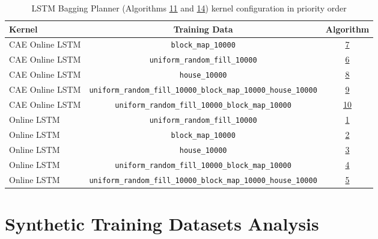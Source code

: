 \begin{table}[h!]
    \centerfloat
    \begin{tabular}{|M{2cm}|c|c|}
         \hline
         \textbf{Kernel} & \textbf{Training Data} & \textbf{Algorithm}\\
         \hline
         \hline
         CAE Online LSTM & \texttt{block\_map\_10000} &  \hyperref[tab: evalalgorithms]{7} \\
         \hline
         CAE Online LSTM & \texttt{uniform\_random\_fill\_10000} &  \hyperref[tab: evalalgorithms]{6} \\
         \hline
         CAE Online LSTM & \texttt{house\_10000} &  \hyperref[tab: evalalgorithms]{8} \\
         \hline
         CAE Online LSTM & \texttt{uniform\_random\_fill\_10000\_block\_map\_10000\_house\_10000} &  \hyperref[tab: evalalgorithms]{9} \\
         \hline
         CAE Online LSTM & \texttt{uniform\_random\_fill\_10000\_block\_map\_10000} &  \hyperref[tab: evalalgorithms]{10} \\
         \hline
         \hline
         Online LSTM & \texttt{uniform\_random\_fill\_10000} &  \hyperref[tab: evalalgorithms]{1} \\
         \hline
         Online LSTM & \texttt{block\_map\_10000} &  \hyperref[tab: evalalgorithms]{2} \\
         \hline
         Online LSTM & \texttt{house\_10000} &  \hyperref[tab: evalalgorithms]{3} \\
         \hline
         Online LSTM & \texttt{uniform\_random\_fill\_10000\_block\_map\_10000} &  \hyperref[tab: evalalgorithms]{4} \\
         \hline
         Online LSTM & \texttt{uniform\_random\_fill\_10000\_block\_map\_10000\_house\_10000} &  \hyperref[tab: evalalgorithms]{5} \\ 
         \hline
    \end{tabular}
    \caption{LSTM Bagging Planner (Algorithms  \hyperref[tab: evalalgorithms]{11} and \hyperref[tab: evalalgorithms]{14}) kernel configuration in priority order}
    \label{tab: eval_lstm_bagging}
\end{table}

\section{Synthetic Training Datasets Analysis}

